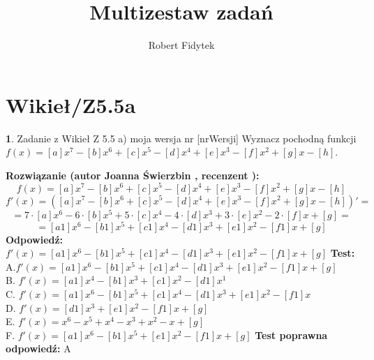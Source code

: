 \documentclass[12pt, a4paper]{article}
\title{Multizestaw zadań}
\author{Robert Fidytek}
\date{}
\theoremstyle{definition} %
\newtheorem{zad}{}
\newcommand{\kategoria}[1]{\section{#1}} %
\newcommand{\zadStart}[1]{\begin{zad}#1\newline} %
\newcommand{\zadStop}{\end{zad}}   %
\newcommand{\rozwStart}[2]{\noindent \textbf{Rozwiązanie (autor #1 , recenzent #2): }\newline} %
\newcommand{\rozwStop}{\newline}                                            %
\newcommand{\odpStart}{\noindent \textbf{Odpowiedź:}\newline}    %
\newcommand{\odpStop}{\newline}                                             %
\newcommand{\testStart}{\noindent \textbf{Test:}\newline} %
\newcommand{\testStop}{\newline} %
\newcommand{\kluczStart}{\noindent \textbf{Test poprawna odpowiedź:}\newline} %
\newcommand{\kluczStop}{\newline} %
\begin{document}
\maketitle


\kategoria{Wikieł/Z5.5a}
\zadStart{Zadanie z Wikieł Z 5.5 a) moja wersja nr [nrWersji]}
Wyznacz pochodną funkcji \\ $f(x)=[a]x^7-[b]x^6+[c]x^5-[d]x^4+[e]x^3-[f]x^2+[g]x-[h]$.
\zadStop
\rozwStart{Joanna Świerzbin}{}
$$f(x)=[a]x^7-[b]x^6+[c]x^5-[d]x^4+[e]x^3-[f]x^2+[g]x-[h]$$
$$f'(x)=([a]x^7-[b]x^6+[c]x^5-[d]x^4+[e]x^3-[f]x^2+[g]x-[h])' = $$
$$ = 7 \cdot [a]x^6-6\cdot [b]x^5+5\cdot [c]x^4-4 \cdot [d]x^3+ 3\cdot[e]x^2-2\cdot [f]x+[g] = $$
$$ = [a1]x^6 - [b1]x^5+ [c1]x^4- [d1]x^3+ [e1]x^2- [f1]x+[g] $$
\rozwStop
\odpStart
$ f'(x)= [a1]x^6 - [b1]x^5+ [c1]x^4- [d1]x^3+ [e1]x^2- [f1]x+[g] $
\odpStop
\testStart
A.$ f'(x)= [a1]x^6 - [b1]x^5+ [c1]x^4- [d1]x^3+ [e1]x^2- [f1]x+[g] $\\
B. $ f'(x)= [a1]x^4 - [b1]x^3+ [c1]x^2- [d1]x^1 $ \\
C. $ f'(x)= [a1]x^6 - [b1]x^5+ [c1]x^4- [d1]x^3+ [e1]x^2- [f1]x $ \\
D. $ f'(x)= [d1]x^3+ [e1]x^2- [f1]x+[g] $\\
E. $ f'(x)= x^6 - x^5+ x^4- x^3+ x^2- x+[g] $\\
F. $ f'(x)= [a1]x^6 - [b1]x^5+ [e1]x^2- [f1]x+[g] $
\testStop
\kluczStart
A
\kluczStop
\end{document}
